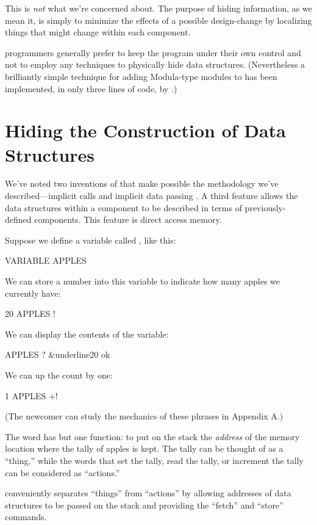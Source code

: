 This is \emph{not} what we're concerned about. The purpose of hiding
information, as we mean it, is simply to minimize the effects of a
possible design-change by localizing things that might change within
each component.

\Forth{} programmers generally prefer to keep the program under their own
control and not to employ any techniques to physically hide data
structures. (Nevertheless a brilliantly simple technique for adding
Modula-type modules to \Forth{} has been implemented, in only three lines
of code, by  \cite{shorre71}.)%
%


\section{Hiding the Construction of Data Structures}%
We've noted two inventions of \Forth{} that make possible the methodology
we've described---implicit calls and implicit data passing%
. A third
feature allows the data structures within a component to be described
in terms of previously-defined components. This feature is direct
access memory.

Suppose we define a variable called , like this:\label{apples1}
\begin{Code}
VARIABLE APPLES
\end{Code}
We can store a number into this variable to indicate how many apples
we currently have:
\begin{Code}
20 APPLES !
\end{Code}
We can display the contents of the variable:
\begin{Code}[commandchars=\&\{\}]
APPLES ? &underline{20 ok}
\end{Code}
We can up the count by one:
\begin{Code}
1 APPLES +!
\end{Code}
(The newcomer can study the mechanics of these phrases in Appendix A.)

The word  has but one function: to put on the stack the
\emph{address} of the memory location where the tally of apples is
kept. The tally can be thought of as a ``thing,'' while the words that
set the tally, read the tally, or increment the tally can be
considered as ``actions.''

\Forth{} conveniently separates ``things'' from ``actions'' by allowing
addresses of data structures to be passed on the stack and providing
the ``fetch'' and ``store'' commands.

